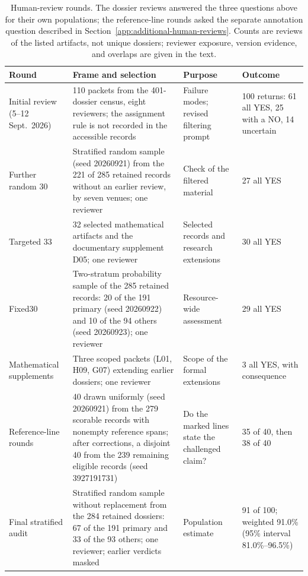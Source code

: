 \begin{table}[htbp]
\centering\small\setlength{\tabcolsep}{3pt}
\begin{tabularx}{\linewidth}{@{}p{.14\linewidth}p{.37\linewidth}p{.21\linewidth}X@{}}
\toprule
Round & Frame and selection & Purpose & Outcome\\\midrule
Initial review (5--12 Sept.\ 2026) & 110 packets from the 401-dossier census, eight reviewers; the assignment rule is not recorded in the accessible records & Failure modes; revised filtering prompt & 100 returns: 61 all YES, 25 with a NO, 14 uncertain\\
Further random 30 & Stratified random sample (seed 20260921) from the 221 of 285 retained records without an earlier review, by seven venues; one reviewer & Check of the filtered material & 27 all YES\\
Targeted 33 & 32 selected mathematical artifacts and the documentary supplement D05; one reviewer & Selected records and research extensions & 30 all YES\\
Fixed30 & Two-stratum probability sample of the 285 retained records: 20 of the 191 primary (seed 20260922) and 10 of the 94 others (seed 20260923); one reviewer & Resource-wide assessment & 29 all YES\\
Mathematical supplements & Three scoped packets (L01, H09, G07) extending earlier dossiers; one reviewer & Scope of the formal extensions & 3 all YES, with consequence\\
Reference-line rounds & 40 drawn uniformly (seed 20260921) from the 279 scorable records with nonempty reference spans; after corrections, a disjoint 40 from the 239 remaining eligible records (seed 3927191731) & Do the marked lines state the challenged claim? & 35 of 40, then 38 of 40\\
Final stratified audit & Stratified random sample without replacement from the 284 retained dossiers: 67 of the 191 primary and 33 of the 93 others; one reviewer; earlier verdicts masked & Population estimate & 91 of 100; weighted 91.0\% (95\% interval 81.0\%--96.5\%)\\
\bottomrule
\end{tabularx}
\caption{Human-review rounds. The dossier reviews answered the three questions above for their own populations; the reference-line rounds asked the separate annotation question described in Section~\ref{app:additional-human-reviews}. Counts are reviews of the listed artifacts, not unique dossiers; reviewer exposure, version evidence, and overlaps are given in the text.}
\label{tab:review-rounds}
\end{table}

